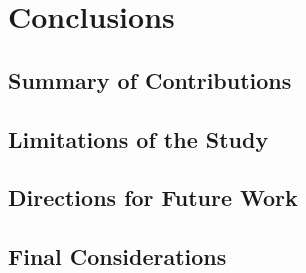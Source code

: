 \chapter{Conclusions}\label{cap:conclusions}

\section{Summary of Contributions}\label{sec:summary-of-contributions}

\section{Limitations of the Study}\label{sec:limitations-of-the-study}

\section{Directions for Future Work}\label{sec:directions-future-work}

\section{Final Considerations}\label{sec:cap08-final-considerations}

